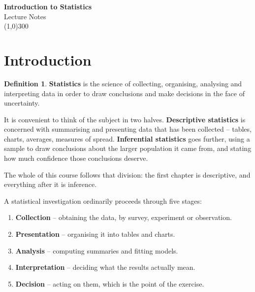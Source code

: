 \documentclass[11pt,a4paper]{article}
\theoremstyle{definition}
\newtheorem{definition}[thm]{Definition}
\begin{document}
\begin{titlepage}
\begin{center}
\vspace*{4cm}
{\Huge\bfseries Introduction to Statistics}\\[1.2cm]
{\large Lecture Notes}\\[3cm]
\line(1,0){300}
\end{center}
\end{titlepage}

\tableofcontents
\thispagestyle{empty}
\clearpage
\setcounter{page}{1}





\section{Introduction}

\begin{definition}
\textbf{Statistics} is the science of collecting, organising, analysing and interpreting
data in order to draw conclusions and make decisions in the face of uncertainty.
\end{definition}

It is convenient to think of the subject in two halves. \textbf{Descriptive statistics} is
concerned with summarising and presenting data that has been collected -- tables, charts,
averages, measures of spread. \textbf{Inferential statistics} goes further, using a sample
to draw conclusions about the larger population it came from, and stating how much
confidence those conclusions deserve.

The whole of this course follows that division: the first chapter is descriptive, and
everything after it is inference.

A statistical investigation ordinarily proceeds through five stages:
\begin{enumerate}
\item \textbf{Collection} -- obtaining the data, by survey, experiment or observation.
\item \textbf{Presentation} -- organising it into tables and charts.
\item \textbf{Analysis} -- computing summaries and fitting models.
\item \textbf{Interpretation} -- deciding what the results actually mean.
\item \textbf{Decision} -- acting on them, which is the point of the exercise.
\end{enumerate}
\end{document}
